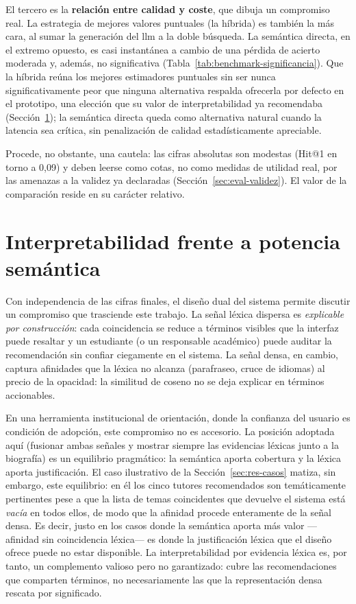El tercero es la \textbf{relación entre calidad y coste}, que dibuja un compromiso real.
La estrategia de mejores valores puntuales (la híbrida) es también la más cara, al sumar la generación del \gls{llm} a la doble búsqueda.
La semántica directa, en el extremo opuesto, es casi instantánea a cambio de una pérdida de acierto moderada y, además, no significativa (Tabla~\ref{tab:benchmark-significancia}).
Que la híbrida reúna los mejores estimadores puntuales sin ser nunca significativamente peor que ninguna alternativa respalda ofrecerla por defecto en el prototipo, una elección que su valor de interpretabilidad ya recomendaba (Sección~\ref{sec:disc-interpretabilidad}); la semántica directa queda como alternativa natural cuando la latencia sea crítica, sin penalización de calidad estadísticamente apreciable.

Procede, no obstante, una cautela: las cifras absolutas son modestas (\mbox{Hit@1} en torno a 0,09) y deben leerse como cotas, no como medidas de utilidad real, por las amenazas a la validez ya declaradas (Sección~\ref{sec:eval-validez}). El valor de la comparación reside en su carácter relativo.

\section{Interpretabilidad frente a potencia semántica}
\label{sec:disc-interpretabilidad}

Con independencia de las cifras finales, el diseño dual del sistema permite discutir un compromiso que trasciende este trabajo.
La señal léxica dispersa es \emph{explicable por construcción}: cada coincidencia se reduce a términos visibles que la interfaz puede resaltar y un estudiante (o un responsable académico) puede auditar la recomendación sin confiar ciegamente en el sistema.
La señal densa, en cambio, captura afinidades que la léxica no alcanza (parafraseo, cruce de idiomas) al precio de la opacidad: la similitud de coseno no se deja explicar en términos accionables.

En una herramienta institucional de orientación, donde la confianza del usuario es condición de adopción, este compromiso no es accesorio.
La posición adoptada aquí (fusionar ambas señales y mostrar siempre las evidencias léxicas junto a la biografía) es un equilibrio pragmático: la semántica aporta cobertura y la léxica aporta justificación.
El caso ilustrativo de la Sección~\ref{sec:res-casos} matiza, sin embargo, este equilibrio: en él los cinco tutores recomendados son temáticamente pertinentes pese a que la lista de temas coincidentes que devuelve el sistema está \emph{vacía} en todos ellos, de modo que la afinidad procede enteramente de la señal densa.
Es decir, justo en los casos donde la semántica aporta más valor ---afinidad sin coincidencia léxica--- es donde la justificación léxica que el diseño ofrece puede no estar disponible.
La interpretabilidad por evidencia léxica es, por tanto, un complemento valioso pero no garantizado: cubre las recomendaciones que comparten términos, no necesariamente las que la representación densa rescata por significado.

